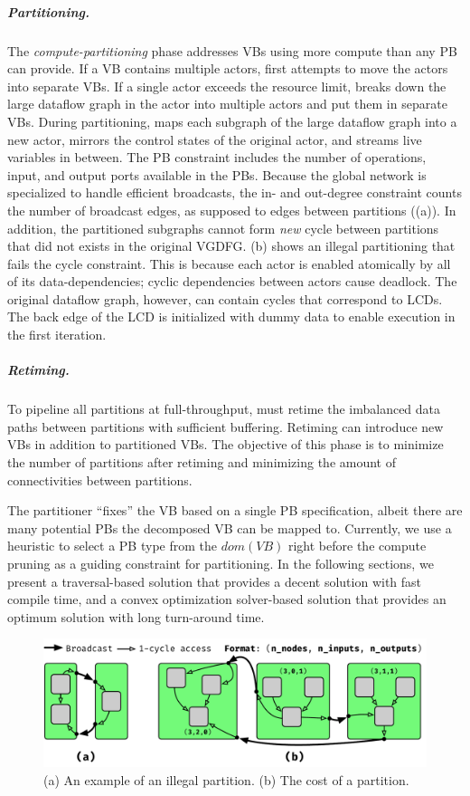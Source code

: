 \subparagraph{Partitioning.}
The {\em compute-partitioning} phase addresses VBs using more compute than any PB can provide. 
If a VB contains multiple actors, \name{} first attempts to move the actors into separate VBs.
If a single actor exceeds the resource limit, \name{} breaks down the large dataflow graph in the actor into multiple actors and put them in separate VBs.
During partitioning, \name{} maps each subgraph of the large dataflow graph into a new actor, mirrors the control states of the original actor, and streams live variables in between.
The PB constraint includes the number of operations, input, and output ports available in the PBs.
Because the global network is specialized to handle efficient broadcasts, the in- and out-degree constraint counts the number of broadcast edges, as supposed to edges between partitions ((a)).
In addition, the partitioned subgraphs cannot form {\em new} cycle between partitions that did not exists in the original VGDFG. 
 (b) shows an illegal partitioning that fails the cycle constraint.
This is because each actor is enabled atomically by all of its data-dependencies; cyclic dependencies between actors cause deadlock.
The original dataflow graph, however, can contain cycles that correspond to LCDs.
The back edge of the LCD is initialized with dummy data to enable execution in the first iteration.

\subparagraph{Retiming.}
To pipeline all partitions at full-throughput, \name{} must retime the imbalanced data paths between partitions with sufficient buffering. 
Retiming can introduce new VBs in addition to partitioned VBs.
The objective of this phase is to minimize the number of partitions after retiming and minimizing the amount of connectivities between partitions.

The partitioner ``fixes'' the VB based on a single PB specification, albeit there are many potential PBs the decomposed VB can be mapped to.
Currently, we use a heuristic to select a PB type from the $dom(VB)$ right before the compute pruning as a guiding constraint for partitioning.
In the following sections, we present a traversal-based solution that provides a decent solution with fast compile time, and a convex optimization solver-based solution that provides an optimum solution with long turn-around time.

\begin{figure}
  \centering
  \includegraphics[width=1\columnwidth]{figs/partition_example.pdf}
  \caption{(a) An example of an illegal partition. (b) The cost of a partition.}
  \label{fig:parteg}
\end{figure}

